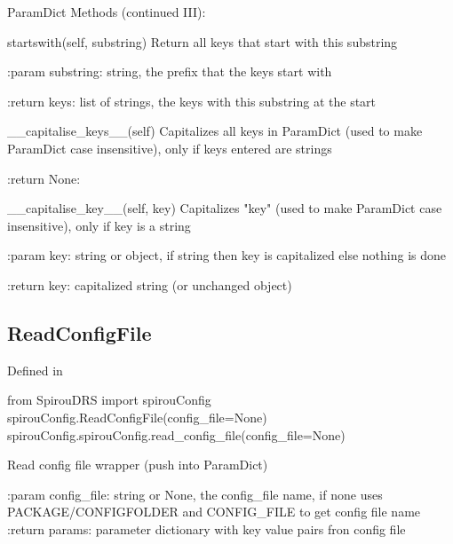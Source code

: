 \noindent\begin{minipage}{\textwidth}
\begin{pythondocstring}
ParamDict Methods (continued III):

	startswith(self, substring)
	        Return all keys that start with this substring

	        :param substring: string, the prefix that the keys start with

	        :return keys: list of strings, the keys with this substring at the start

	__capitalise_keys__(self)
	        Capitalizes all keys in ParamDict (used to make ParamDict case
	        insensitive), only if keys entered are strings

	        :return None:

	__capitalise_key__(self, key)
        Capitalizes "key" (used to make ParamDict case insensitive), only if
        key is a string

        :param key: string or object, if string then key is capitalized else
                    nothing is done

        :return key: capitalized string (or unchanged object)

\end{pythondocstring}
\end{minipage}

\noindent\begin{minipage}{\textwidth}
\subsection{ReadConfigFile}

Defined in \spirouConfig{}

\begin{pythonbox}
from SpirouDRS import spirouConfig
spirouConfig.ReadConfigFile(config_file=None)
spirouConfig.spirouConfig.read_config_file(config_file=None)
\end{pythonbox}

\begin{pythondocstring}
Read config file wrapper (push into ParamDict)

:param config_file: string or None, the config_file name, if none uses
                    PACKAGE/CONFIGFOLDER and CONFIG_FILE to get config
                    file name
:return params: parameter dictionary with key value pairs fron config file
\end{pythondocstring}
\end{minipage}


